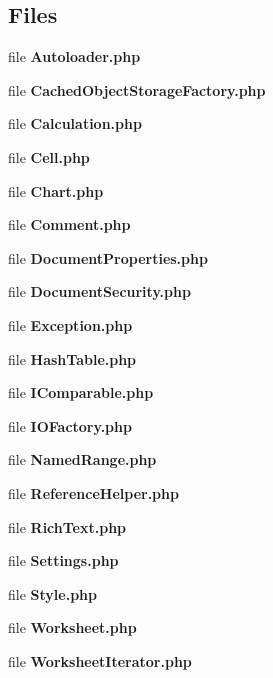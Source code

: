 \subsection*{Files}
\begin{DoxyCompactItemize}
\item 
file {\bfseries Autoloader.\+php}
\item 
file {\bfseries Cached\+Object\+Storage\+Factory.\+php}
\item 
file {\bfseries Calculation.\+php}
\item 
file {\bfseries Cell.\+php}
\item 
file {\bfseries Chart.\+php}
\item 
file {\bfseries Comment.\+php}
\item 
file {\bfseries Document\+Properties.\+php}
\item 
file {\bfseries Document\+Security.\+php}
\item 
file {\bfseries Exception.\+php}
\item 
file {\bfseries Hash\+Table.\+php}
\item 
file {\bfseries I\+Comparable.\+php}
\item 
file {\bfseries I\+O\+Factory.\+php}
\item 
file {\bfseries Named\+Range.\+php}
\item 
file {\bfseries Reference\+Helper.\+php}
\item 
file {\bfseries Rich\+Text.\+php}
\item 
file {\bfseries Settings.\+php}
\item 
file {\bfseries Style.\+php}
\item 
file {\bfseries Worksheet.\+php}
\item 
file {\bfseries Worksheet\+Iterator.\+php}
\end{DoxyCompactItemize}
